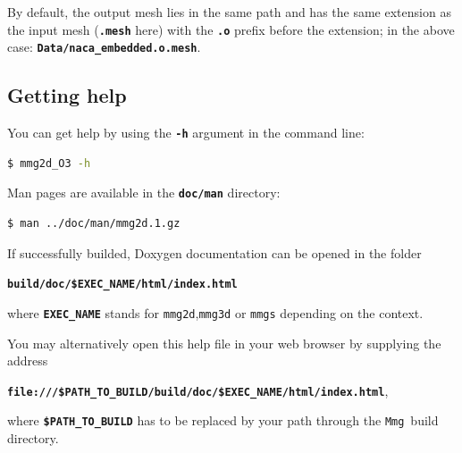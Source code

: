 \documentclass{article}
\newcommand{\ttb}[1]{\texttt{\textbf{#1}}}
\newcommand{\mmg}{\texttt{Mmg}}
\begin{document}
By default, the output mesh lies in the same path and has the same
extension as the input mesh (\ttb{.mesh} here) with the \ttb{.o}
prefix before the extension; in the above case: \ttb{Data/naca\_embedded.o.mesh}.

\subsection{Getting help}

You can get help by using the \ttb{-h} argument in the command line:
\begin{lstlisting}[language=bash]
$ mmg2d_O3 -h
\end{lstlisting}
%
Man pages are available in the \ttb{doc/man} directory:
\begin{lstlisting}[language=bash]
$ man ../doc/man/mmg2d.1.gz
\end{lstlisting}

If successfully builded, Doxygen documentation can be opened in the folder
\begin{center}
\ttb{build/doc/\$EXEC\_NAME/html/index.html} 
\end{center}
where
\ttb{EXEC\_NAME} stands for \texttt{mmg2d},\texttt{mmg3d} or \texttt{mmgs} depending on the context. 

You may alternatively open this help file in your
web browser by supplying the address 
\begin{center} 
\ttb{file:///\$PATH\_TO\_BUILD/build/doc/\$EXEC\_NAME/html/index.html},
\end{center}
where \ttb{\$PATH\_TO\_BUILD} has to be replaced by your path through
the \mmg\ build directory.
\end{document}
